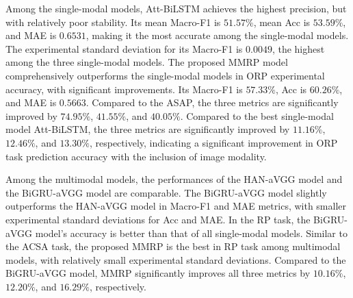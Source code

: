 \documentclass[preprint,12pt]{elsarticle}
\begin{document}
\begin{table}[htp]
	\label{table:rp_improve}
\end{table}

Among the single-modal models, Att-BiLSTM achieves the highest precision, but with relatively poor stability. Its mean Macro-F1 is $51.57\%$, mean Acc is $53.59\%$, and MAE is $0.6531$, making it the most accurate among the single-modal models. The experimental standard deviation for its Macro-F1 is $0.0049$, the highest among the three single-modal models. The proposed MMRP model comprehensively outperforms the single-modal models in ORP experimental accuracy, with significant improvements. Its Macro-F1 is $57.33\%$, Acc is $60.26\%$, and MAE is $0.5663$. Compared to the ASAP, the three metrics are significantly improved by $74.95\%$, $41.55\%$, and $40.05\%$. Compared to the best single-modal model Att-BiLSTM, the three metrics are significantly improved by $11.16\%$, $12.46\%$, and $13.30\%$, respectively, indicating a significant improvement in ORP task prediction accuracy with the inclusion of image modality.

Among the multimodal models, the performances of the HAN-aVGG model and the BiGRU-aVGG model are comparable. The BiGRU-aVGG model slightly outperforms the HAN-aVGG model in Macro-F1 and MAE metrics, with smaller experimental standard deviations for Acc and MAE. In the RP task, the BiGRU-aVGG model's accuracy is better than that of all single-modal models. Similar to the ACSA task, the proposed MMRP is the best in RP task among multimodal models, with relatively small experimental standard deviations. Compared to the BiGRU-aVGG model, MMRP significantly improves all three metrics by $10.16\%$, $12.20\%$, and $16.29\%$, respectively. 
\end{document}

